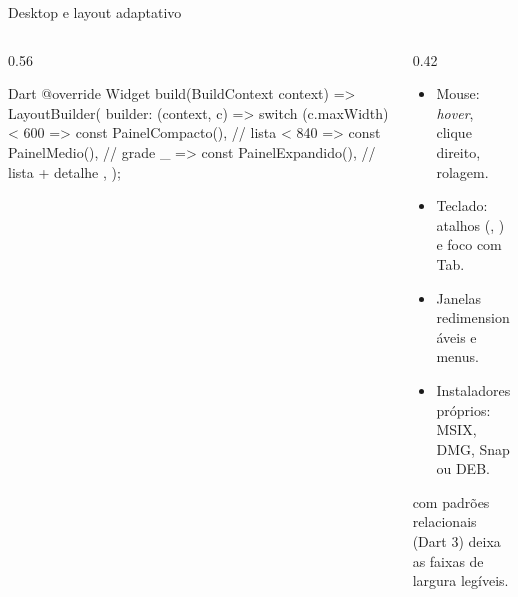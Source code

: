 \documentclass[aspectratio=169,10pt]{beamer}
\begin{document}
\begin{frame}[fragile]{Desktop e layout adaptativo}
  \begin{columns}[T]
    \begin{column}{0.56\textwidth}
\begin{codigo}[title=Um painel para cada largura]{Dart}
@override
Widget build(BuildContext context) => LayoutBuilder(
  builder: (context, c) => switch (c.maxWidth) {
    < 600 => const PainelCompacto(),    // lista
    < 840 => const PainelMedio(),       // grade
    _ => const PainelExpandido(),       // lista + detalhe
  },
);
\end{codigo}
    \end{column}
    \begin{column}{0.42\textwidth}
      \begin{conceito}
        \begin{itemize}
          \item Mouse: \emph{hover}, clique direito, rolagem.
          \item Teclado: atalhos (, ) e foco com Tab.
          \item Janelas redimensionáveis e menus.
          \item Instaladores próprios: MSIX, DMG, Snap ou DEB.
        \end{itemize}
      \end{conceito}
      \begin{dica}
         com padrões relacionais (Dart 3) deixa as faixas de largura legíveis.
      \end{dica}
    \end{column}
  \end{columns}
\end{frame}
\end{document}
